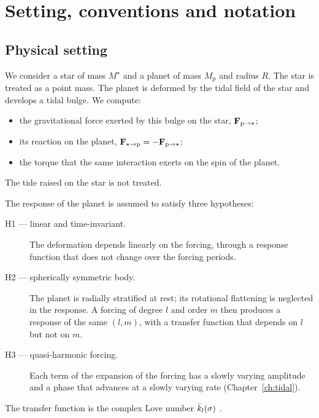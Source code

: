 \chapter{Setting, conventions and notation}\label{app:conventions}

\section{Physical setting}
We consider a star of mass $M^\star$ and a planet of mass $M_{\mathrm p}$ and radius $R$. The star is treated as a point mass. The planet is deformed by the tidal field of the star and develops a tidal bulge. We compute:
\begin{itemize}
  \item the gravitational force exerted by this bulge on the star, $\mathbf F_{\mathrm p\to\star}$;
  \item its reaction on the planet, $\mathbf F_{\star\to\mathrm p}=-\mathbf F_{\mathrm p\to\star}$;
  \item the torque that the same interaction exerts on the spin of the planet.
\end{itemize}
The tide raised on the star is not treated.

The response of the planet is assumed to satisfy three hypotheses:
\begin{description}
  \item[H1 — linear and time-invariant.] The deformation depends linearly on the forcing, through a response function that does not change over the forcing periods.
  \item[H2 — spherically symmetric body.] The planet is radially stratified at rest; its rotational flattening is neglected in the response. A forcing of degree $l$ and order $m$ then produces a response of the same $(l,m)$, with a transfer function that depends on $l$ but not on $m$.
  \item[H3 — quasi-harmonic forcing.] Each term of the expansion of the forcing has a slowly varying amplitude and a phase that advances at a slowly varying rate (Chapter~\ref{ch:tidal}).
\end{description}
The transfer function is the complex Love number $\bar k_l(\sigma)$ \citep{EfroimskyMakarov2013,EfroimskyMakarov2014}.


